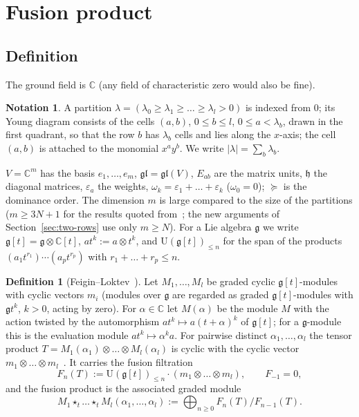\documentclass[11pt]{amsart}
\numberwithin{equation}{section}
\theoremstyle{definition}
\newtheorem{definition}[equation]{Definition}
\newtheorem{notation}[equation]{Notation}
\newcommand{\gl}{\mathfrak{gl}}
\newcommand{\fg}{\mathfrak{g}}
\newcommand{\fh}{\mathfrak{h}}
\newcommand{\U}{\mathrm{U}}
\newcommand{\eps}{\varepsilon}
\begin{document}
	
	\section{Fusion product}\label{sec:fusion}
	
	\subsection{Definition}\label{ssec:def-fusion}
	
	The ground field is $\mathbb C$ (any field of characteristic zero would also be fine).
	
	\begin{notation}\label{not:conv}
		A partition $\lambda=(\lambda_0\ge\lambda_1\ge\dots\ge\lambda_l>0)$ is indexed from $0$; its Young diagram consists of the cells $(a,b)$, $0\le b\le l$, $0\le a<\lambda_b$, drawn in the first quadrant, so that the row $b$ has $\lambda_b$ cells and lies along the $x$-axis; the cell $(a,b)$ is attached to the monomial $x^ay^b$. We write $|\lambda|=\sum_b\lambda_b$.
		
		$V=\mathbb{C}^m$ has the basis $e_1,\dots,e_m$, $\gl=\gl(V)$, $E_{ab}$ are the matrix units, $\fh$ the diagonal matrices, $\eps_a$ the weights, $\omega_k=\eps_1+\dots+\eps_k$ ($\omega_0=0$); $\succeq$ is the dominance order. The dimension $m$ is large compared to the size of the partitions ($m\ge 3N+1$ for the results quoted from~\cite{KM}; the new arguments of Section~\ref{sec:two-rows} use only $m\ge N$). For a Lie algebra $\fg$ we write $\fg[t]=\fg\otimes\mathbb{C}[t]$, $at^k:=a\otimes t^k$, and $\U(\fg[t])_{\le n}$ for the span of the products $(a_1t^{r_1})\cdots(a_pt^{r_p})$ with $r_1+\dots+r_p\le n$.
	\end{notation}
	
	\begin{definition}[Feigin--Loktev~\cite{FeLo}]\label{def:fusion}
		Let $M_1,\dots,M_l$ be graded cyclic $\fg[t]$-modules with cyclic vectors $m_i$ (modules over $\fg$ are regarded as graded $\fg[t]$-modules with $\fg t^{k}$, $k>0$, acting by zero). For $\alpha\in\mathbb{C}$ let $M(\alpha)$ be the module $M$ with the action twisted by the automorphism $at^k\mapsto a(t+\alpha)^k$ of $\fg[t]$; for a $\fg$-module this is the evaluation module $at^k\mapsto\alpha^ka$. For pairwise distinct $\alpha_1,\dots,\alpha_l$ the tensor product $T=M_1(\alpha_1)\otimes\dots\otimes M_l(\alpha_l)$ is cyclic with the cyclic vector $m_1\otimes\dots\otimes m_l$~\cite{FeLo}. It carries the fusion filtration
		\[
		F_n(T):=\U(\fg[t])_{\le n}\cdot(m_1\otimes\dots\otimes m_l),\qquad F_{-1}=0,
		\]
		and the fusion product is the associated graded module
		\[
		M_1\star_t\dots\star_tM_l(\alpha_1,\dots,\alpha_l):=\bigoplus_{n\ge0}F_n(T)/F_{n-1}(T).
		\]
	\end{definition}
	
\end{document}
